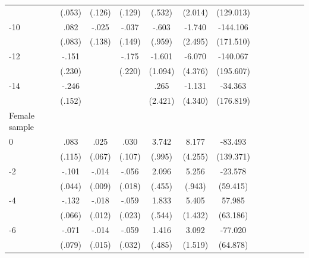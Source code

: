 \begin{table}[h]
\begin{adjustbox}{max width=\linewidth}
\begin{threeparttable}
{\begin{tabular}{l*{6}{S
S}}
                &   (.053)         &   (.126)         &   (.129)         &   (.532)         &  (2.014)         &(129.013)         \\
-10            &     .082         &    -.025         &    -.037         &    -.603         &   -1.740         & -144.106         \\
                &   (.083)         &   (.138)         &   (.149)         &   (.959)         &  (2.495)         &(171.510)         \\
-12           &    -.151         &                  &    -.175         &   -1.601         &   -6.070         & -140.067         \\
                &   (.230)         &                  &   (.220)         &  (1.094)         &  (4.376)         &(195.607)         \\
-14           &    -.246         &                  &                  &     .265         &   -1.131         &  -34.363         \\
                &   (.152)         &                  &                  &  (2.421)         &  (4.340)         &(176.819)         \\
\midrule
Female sample &&&&&&\\
0               &     .083         &     .025         &     .030         &    3.742\sym{***}&    8.177\sym{*}  &  -83.493         \\
                &   (.115)         &   (.067)         &   (.107)         &   (.995)         &  (4.255)         &(139.371)         \\
-2             &    -.101\sym{**} &    -.014         &    -.056\sym{***}&    2.096\sym{***}&    5.256\sym{***}&  -23.578         \\
                &   (.044)         &   (.009)         &   (.018)         &   (.455)         &   (.943)         & (59.415)         \\
-4             &    -.132\sym{**} &    -.018         &    -.059\sym{**} &    1.833\sym{***}&    5.405\sym{***}&   57.985         \\
                &   (.066)         &   (.012)         &   (.023)         &   (.544)         &  (1.432)         & (63.186)         \\
-6             &    -.071         &    -.014         &    -.059\sym{*}  &    1.416\sym{***}&    3.092\sym{**} &  -77.020         \\
                &   (.079)         &   (.015)         &   (.032)         &   (.485)         &  (1.519)         & (64.878)         \\

\end{tabular}}
\end{threeparttable}
\end{adjustbox}
\end{table}
